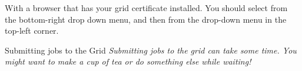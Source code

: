 With a browser that has your grid certificate installed.
You should select  from the bottom-right
drop down menu, and then  from the  drop-down menu
in the top-left corner.

\begin{warningbox}{Submitting jobs to the Grid}
\emph{Submitting jobs to the grid can take some time.
You might want to make a cup of tea or do something else while waiting!}
\end{warningbox}

%
